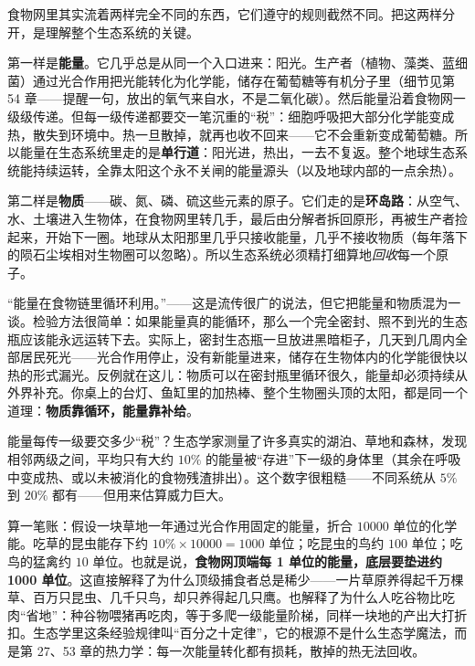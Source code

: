 食物网里其实流着两样完全不同的东西，它们遵守的规则截然不同。把这两样分开，是理解整个生态系统的关键。

第一样是\textbf{能量}。它几乎总是从同一个入口进来：阳光。生产者（植物、藻类、蓝细菌）通过光合作用把光能转化为化学能，储存在葡萄糖等有机分子里（细节见第 54 章——提醒一句，放出的氧气来自水，不是二氧化碳）。然后能量沿着食物网一级级传递。但每一级传递都要交一笔沉重的“税”：细胞呼吸把大部分化学能变成热，散失到环境中。热一旦散掉，就再也收不回来——它不会重新变成葡萄糖。所以能量在生态系统里走的是\textbf{单行道}：阳光进，热出，一去不复返。整个地球生态系统能持续运转，全靠太阳这个永不关闸的能量源头（以及地球内部的一点余热）。

第二样是\textbf{物质}——碳、氮、磷、硫这些元素的原子。它们走的是\textbf{环岛路}：从空气、水、土壤进入生物体，在食物网里转几手，最后由分解者拆回原形，再被生产者捡起来，开始下一圈。地球从太阳那里几乎只接收能量，几乎不接收物质（每年落下的陨石尘埃相对生物圈可以忽略）。所以生态系统必须精打细算地\emph{回收}每一个原子。

\begin{wuqu}
“能量在食物链里循环利用。”——这是流传很广的说法，但它把能量和物质混为一谈。检验方法很简单：如果能量真的能循环，那么一个完全密封、照不到光的生态瓶应该能永远运转下去。实际上，密封生态瓶一旦放进黑暗柜子，几天到几周内全部居民死光——光合作用停止，没有新能量进来，储存在生物体内的化学能很快以热的形式漏光。反例就在这儿：物质可以在密封瓶里循环很久，能量却必须持续从外界补充。你桌上的台灯、鱼缸里的加热棒、整个生物圈头顶的太阳，都是同一个道理：\textbf{物质靠循环，能量靠补给}。
\end{wuqu}

\begin{qiaoliang}
能量每传一级要交多少“税”？生态学家测量了许多真实的湖泊、草地和森林，发现相邻两级之间，平均只有大约 $10\%$ 的能量被“存进”下一级的身体里（其余在呼吸中变成热、或以未被消化的食物残渣排出）。这个数字很粗糙——不同系统从 $5\%$ 到 $20\%$ 都有——但用来估算威力巨大。

算一笔账：假设一块草地一年通过光合作用固定的能量，折合 $10000$ 单位的化学能。吃草的昆虫能存下约 $10\%\times 10000=1000$ 单位；吃昆虫的鸟约 $100$ 单位；吃鸟的猛禽约 $10$ 单位。也就是说，\textbf{食物网顶端每 1 单位的能量，底层要垫进约 1000 单位}。这直接解释了为什么顶级捕食者总是稀少——一片草原养得起千万棵草、百万只昆虫、几千只鸟，却只养得起几只鹰。也解释了为什么人吃谷物比吃肉“省地”：种谷物喂猪再吃肉，等于多爬一级能量阶梯，同样一块地的产出大打折扣。生态学里这条经验规律叫“百分之十定律”，它的根源不是什么生态学魔法，而是第 27、53 章的热力学：每一次能量转化都有损耗，散掉的热无法回收。
\end{qiaoliang}

